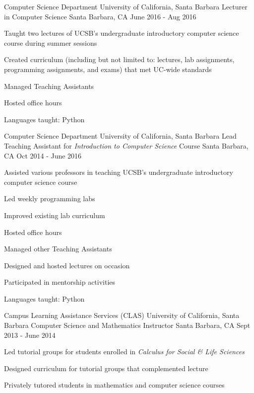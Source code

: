 \begin{cventries}
  \cventry
{Computer Science Department \newline University of California, Santa Barbara}
    {Lecturer in Computer Science}
    {Santa Barbara, CA}
    {June 2016 - Aug 2016}
    {
      \begin{cvitems}
	\item {Taught two lectures of UCSB's undergraduate introductory computer science course during summer sessions}\\
	\begin{cvitems}
         \item Created curriculum (including but not limited to: lectures, lab assignments, programming assignments, and exams) that met UC-wide standards
	\item Managed Teaching Assistants
	\item Hosted office hours 
	\end{cvitems}
	\vspace{2mm}
	\item Languages taught: Python
      \end{cvitems}
    }

  \cventry
{Computer Science Department \newline University of California, Santa Barbara}
    {Lead Teaching Assistant for \emph{Introduction to Computer Science} Course}
    {Santa Barbara, CA}
    {Oct 2014 - June 2016}
    {
      \begin{cvitems}
	\item {Assisted various professors in teaching UCSB's undergraduate introductory computer science course}\\
	 \begin{cvitems}
        \item {Led weekly programming labs}
        \item Improved existing lab curriculum
        \item {Hosted office hours}
        \item {Managed other Teaching Assistants}
	\item {Designed and hosted lectures on occasion}
	\end{cvitems}
	\vspace{2mm}
	\item Participated in mentorship activities
	\item Languages taught: Python
      \end{cvitems}
    }

  \cventry
{Campus Learning Assistance Services (CLAS) \newline University of California, Santa Barbara}
    {Computer Science and Mathematics Instructor}
    {Santa Barbara, CA}
    {Sept 2013 - June 2014}
    {
      \begin{cvitems}
	\item {Led tutorial groups for students enrolled in \emph{Calculus for Social \& Life Sciences}}
	\item {Designed curriculum for tutorial groups that complemented lecture}
        \item {Privately tutored students in mathematics and computer science courses}
      \end{cvitems}
    }


\end{cventries}
